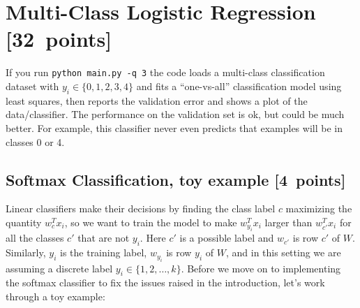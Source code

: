 \documentclass{article}
\newcommand\pts[1]{\textcolor{pointscolour}{[#1~points]}}
\begin{document}
\clearpage
\section{Multi-Class Logistic Regression \pts{32}}

If you run \verb|python main.py -q 3| the code loads a multi-class
classification dataset with $y_i \in \{0,1,2,3,4\}$ and fits a ``one-vs-all'' classification
model using least squares, then reports the validation error and shows a plot of the data/classifier.
The performance on the validation set is ok, but could be much better.
For example, this classifier never even predicts that examples will be in classes 0 or 4.


\subsection{Softmax Classification, toy example \pts{4}}

Linear classifiers make their decisions by finding the class label $c$ maximizing the quantity $w_c^Tx_i$, so we want to train the model to make $w_{y_i}^Tx_i$ larger than $w_{c'}^Tx_i$ for all the classes $c'$ that are not $y_i$.
Here $c'$ is a possible label and $w_{c'}$ is row $c'$ of $W$. Similarly, $y_i$ is the training label, $w_{y_i}$ is row $y_i$ of $W$, and in this setting we are assuming a discrete label $y_i \in \{1,2,\dots,k\}$. Before we move on to implementing the softmax classifier to fix the issues raised in the introduction, let's work through a toy example:
\end{document}

